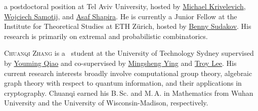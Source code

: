 \documentclass{toc}
\theoremstyle{plain}
\numberwithin{equation}{section}
\theoremstyle{definition}
\begin{document}
\begin{tocaboutauthors}
\begin{tocabout}[WigdersonY]
a postdoctoral position at Tel Aviv University,  hosted by \href{http://www.math.tau.ac.il/~krivelev/}{Michael Krivelevich}, \href{http://www.math.tau.ac.il/~samotij/}{Wojciech Samotij}, and \href{http://www.math.tau.ac.il/~asafico/}{Asaf Shapira}. He is currently a Junior Fellow at the Institute for Theoretical Studies at ETH Z\"urich, hosted by \href{https://people.math.ethz.ch/~sudakovb/}{Benny Sudakov}. His research is primarily on extremal and probabilistic combinatorics.
 \end{tocabout}
 \begin{tocabout}[Zhang]
 	\textsc{Chuanqi Zhang} is a \phd\ student at the University of Technology Sydney supervised by \href{https://profiles.uts.edu.au/Youming.Qiao}{Youming Qiao} and co-supervised by \href{https://scholar.google.com.au/citations?user=jjPif6cAAAAJ&hl=en}{Mingsheng Ying}
 	and \href{https://troylee.org/}{Troy Lee}. His current research interests broadly involve computational group theory, algebraic graph theory with respect to quantum information, and their applications in cryptography. Chuanqi earned his B.\,Sc. and M.\,A. in Mathematics from Wuhan University and the University of Wisconsin-Madison, respectively. 
 \end{tocabout}
 \end{tocaboutauthors}
\end{document}
